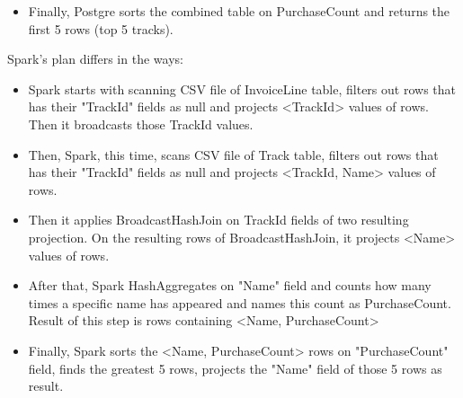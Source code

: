 \documentclass[10pt]{article}
\begin{document}
\begin{enumerate}
\begin{itemize}
			\item Finally, Postgre sorts the combined table on PurchaseCount and returns the first 5 rows (top 5 tracks).
		\end{itemize}
		\bigskip
		
		
		Spark's plan differs in the ways:\\
		\begin{itemize}
			\item Spark starts with scanning CSV file of InvoiceLine table, filters out rows that has their "TrackId" fields as null and projects <TrackId> values of rows. Then it broadcasts those TrackId values.
			
			\item Then, Spark, this time, scans CSV file of Track table, filters out rows that has their "TrackId" fields as null and projects <TrackId, Name> values of rows.
			
			\item Then it applies BroadcastHashJoin on TrackId fields of two resulting projection. On the resulting rows of BroadcastHashJoin, it projects <Name> values of rows.
			
			\item After that, Spark HashAggregates on "Name" field and counts how many times a specific name has appeared and names this count as PurchaseCount. Result of this step is rows containing <Name, PurchaseCount>
			
			\item Finally, Spark sorts the <Name, PurchaseCount> rows on "PurchaseCount" field, finds the greatest 5 rows, projects the "Name" field of those 5 rows as result.
		\end{itemize}
		
		
		
	\end{enumerate}
	
	
	
	
	
	\clearpage
\end{document}
